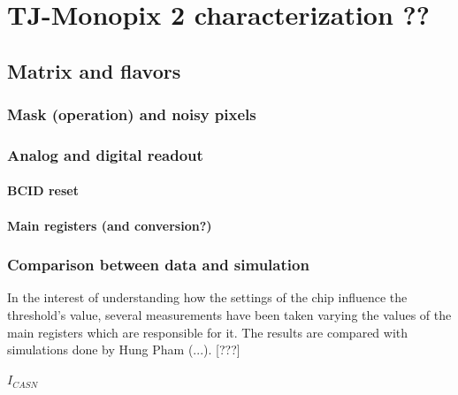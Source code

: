 
\chapter{TJ-Monopix 2 characterization ??}

\section{Matrix and flavors}

\subsection{Mask (operation) and noisy pixels}

\subsection{Analog and digital readout}

\subsubsection{BCID reset}
\begin{comment}
REFERENZE
\end{comment}

\subsubsection{Main registers (and conversion?)}



\subsection{Comparison between data and simulation}

In the interest of understanding how the settings of the chip influence the threshold's value, several measurements have been taken varying the values of the main registers which are responsible for it.
The results are compared with simulations done by Hung Pham (...). [???]

\subsubsection{$I_{CASN}$}

